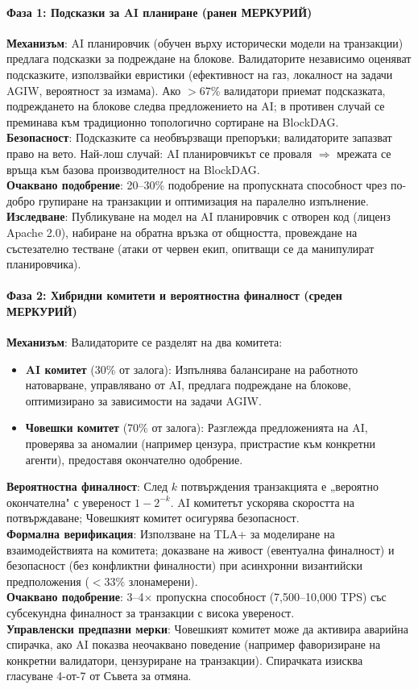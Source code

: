 \documentclass[11pt]{article}
\begin{document}
\paragraph{Фаза 1: Подсказки за AI планиране (ранен МЕРКУРИЙ)}
\textbf{Механизъм}: AI планировчик (обучен върху исторически модели на транзакции) предлага подсказки за подреждане на блокове. Валидаторите независимо оценяват подсказките, използвайки евристики (ефективност на газ, локалност на задачи AGIW, вероятност за измама). Ако $>67\%$ валидатори приемат подсказката, подреждането на блокове следва предложението на AI; в противен случай се преминава към традиционно топологично сортиране на BlockDAG.\\
\textbf{Безопасност}: Подсказките са необвързващи препоръки; валидаторите запазват право на вето. Най-лош случай: AI планировчикът се проваля $\Rightarrow$ мрежата се връща към базова производителност на BlockDAG.\\
\textbf{Очаквано подобрение}: 20--30\% подобрение на пропускната способност чрез по-добро групиране на транзакции и оптимизация на паралелно изпълнение.\\
\textbf{Изследване}: Публикуване на модел на AI планировчик с отворен код (лиценз Apache 2.0), набиране на обратна връзка от общността, провеждане на състезателно тестване (атаки от червен екип, опитващи се да манипулират планировчика).

\paragraph{Фаза 2: Хибридни комитети и вероятностна финалност (среден МЕРКУРИЙ)}
\textbf{Механизъм}: Валидаторите се разделят на два комитета:
\begin{itemize}[noitemsep]
  \item \textbf{AI комитет} (30\% от залога): Изпълнява балансиране на работното натоварване, управлявано от AI, предлага подреждане на блокове, оптимизирано за зависимости на задачи AGIW.
  \item \textbf{Човешки комитет} (70\% от залога): Разглежда предложенията на AI, проверява за аномалии (например цензура, пристрастие към конкретни агенти), предоставя окончателно одобрение.
\end{itemize}
\textbf{Вероятностна финалност}: След $k$ потвърждения транзакцията е „вероятно окончателна" с увереност $1 - 2^{-k}$. AI комитетът ускорява скоростта на потвърждаване; Човешкият комитет осигурява безопасност.\\
\textbf{Формална верификация}: Използване на TLA+ за моделиране на взаимодействията на комитета; доказване на живост (евентуална финалност) и безопасност (без конфликтни финалности) при асинхронни византийски предположения ($<33\%$ злонамерени).\\
\textbf{Очаквано подобрение}: 3--4$\times$ пропускна способност (7,500--10,000 TPS) със субсекундна финалност за транзакции с висока увереност.\\
\textbf{Управленски предпазни мерки}: Човешкият комитет може да активира аварийна спирачка, ако AI показва неочаквано поведение (например фаворизиране на конкретни валидатори, цензуриране на транзакции). Спирачката изисква гласуване 4-от-7 от Съвета за отмяна.
\end{document}
